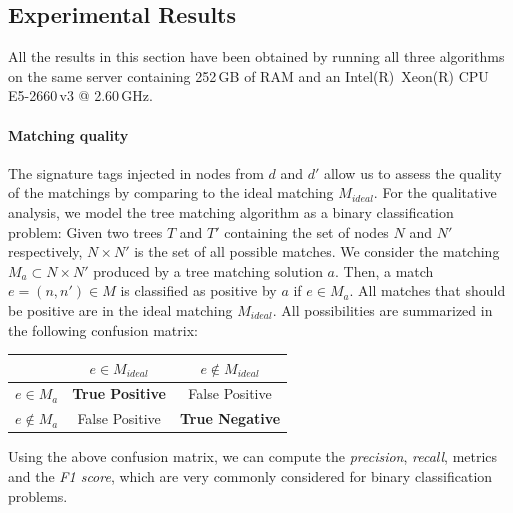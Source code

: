 \subsection{Experimental Results}\label{sec:performances}
All the results in this section have been obtained by running all three algorithms on the same server containing 252\,GB of RAM and an Intel(R)~Xeon(R) CPU E5-2660\,v3 @ 2.60\,GHz.

\paragraph{Matching quality}
The signature tags injected in nodes from $d$ and $d'$ allow us to assess the quality of the matchings by comparing to the ideal matching $M_{ideal}$.
For the qualitative analysis, we model the tree matching algorithm as a binary classification problem: Given two trees $T$ and $T'$ containing the set of nodes $N$ and $N'$ respectively, $N \times N'$ is the set of all possible matches.
We consider the matching $M_a \subset N \times N'$ produced by a tree matching solution $a$.
Then, a match $e=(n,n') \in M$ is classified as positive by $a$ if $e \in M_a$.
All matches that should be positive are in the ideal matching $M_{ideal}$.
All possibilities are summarized in the following confusion matrix:
\begin{center}
    \begin{tabular}[h]{l|c|c|}
    \cline{2-3} 
    
                                          & $e \in M_{ideal}$ & $e \notin M_{ideal}$ \\
    \hline
    \multicolumn{1}{|l|}{$e \in M_a$}    & \textbf{True Positive} & False Positive\\
    \hline
    \multicolumn{1}{|l|}{$e \notin M_a$} &         False Positive & \textbf{True Negative}\\
    \hline
    \end{tabular}
\end{center}

Using the above confusion matrix, we can compute the \textit{precision}, \textit{recall}, metrics and the \textit{F1 score}, which are very commonly considered for binary classification problems.

